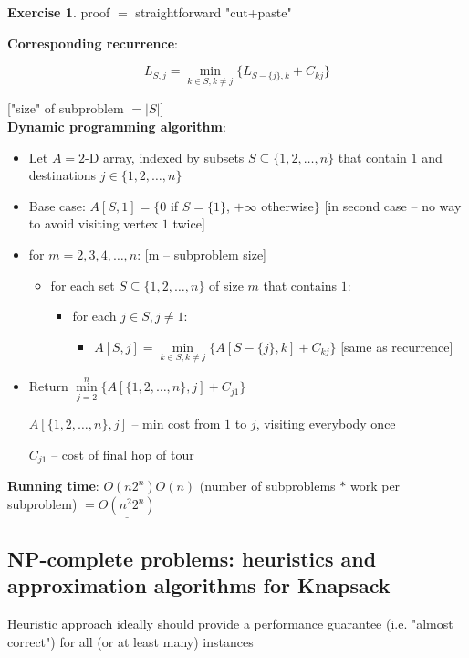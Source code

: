 \documentclass[a4paper,12pt]{article}
\theoremstyle{plain}
\theoremstyle{definition}
\newtheorem{problem}{Exercise}[section]
\theoremstyle{remark}
\begin{document}
\begin{problem} proof $=$ straightforward "cut+paste"\end{problem}

\textbf{Corresponding recurrence}:

\[
L_{S,j} = \min\limits_{k \in S, k \neq j} \{ L_{S-\{j\},k} + C_{kj} \}
\]

["size" of subproblem $= |S|$]
\\

\textbf{Dynamic programming algorithm}:
\begin{itemize}
	\item Let $A = 2$-D array, indexed by subsets $S \subseteq \{1, 2, \dots, n\}$ that contain $1$ and destinations $j \in \{1, 2, \dots, n\}$
	\item Base case: $A[S,1] = \{0$ if $S=\{1\}$, $+\infty$ otherwise$\}$ [in second case -- no way to avoid visiting vertex $1$ twice]
	\item for $m = 2, 3, 4, \dots, n$: [m -- subproblem size]
	\begin{itemize}
		\item for each set $S \subseteq \{1, 2, \dots, n\}$ of size $m$ that contains $1$:
		\begin{itemize}
			\item for each $j \in S, j \neq 1$:
			\begin{itemize}
				\item $A[S,j] = \min\limits_{k \in S, k \neq j} \{ A[S-\{j\}, k] + C_{kj}\}$ [same as recurrence]
			\end{itemize}
		\end{itemize}
	\end{itemize}
	\item Return $\min\limits_{j = 2}^{n} \{ A[\{1, 2, \dots, n\}, j] + C_{j1} \}$

	$A[\{1, 2, \dots, n\}, j]$ -- min cost from $1$ to $j$, visiting everybody once

	$C_{j1}$ -- cost of final hop of tour
\end{itemize}

\textbf{Running time}: $O(n 2^n) O (n)$ (number of subproblems $*$ work per subproblem) $= \underline{O(n^2 2^n)}$



\subsection{NP-complete problems: heuristics and approximation algorithms for Knapsack}
Heuristic approach ideally should provide a performance guarantee (i.e. "almost correct") for all (or at least many) instances
\\
\end{document}
